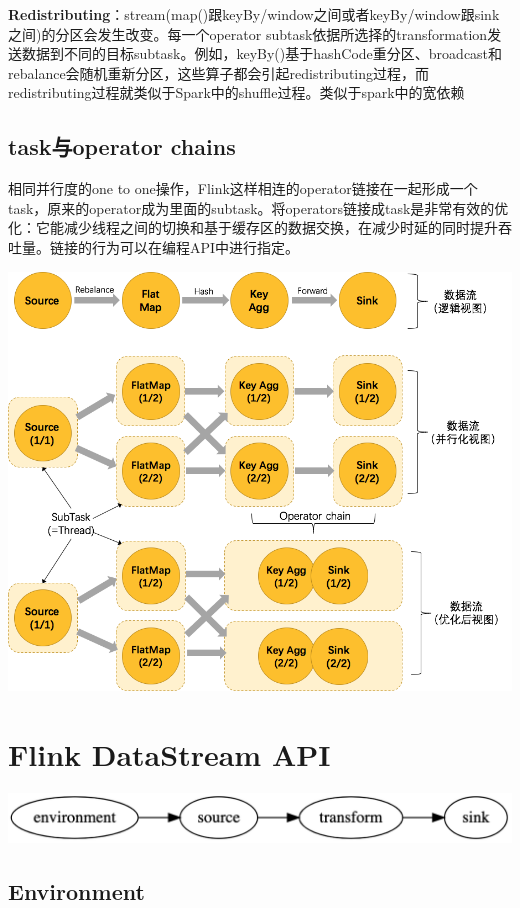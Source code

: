 \documentclass[oneside]{ctexbook}
\begin{document}
\textbf{Redistributing}：stream(map()跟keyBy/window之间或者keyBy/window跟sink之间)的分区会发生改变。每一个operator subtask依据所选择的transformation发送数据到不同的目标subtask。例如，keyBy()基于hashCode重分区、broadcast和rebalance会随机重新分区，这些算子都会引起redistributing过程，而redistributing过程就类似于Spark中的shuffle过程。类似于spark中的宽依赖

\section{task与operator chains}

相同并行度的one to one操作，Flink这样相连的operator链接在一起形成一个task，原来的operator成为里面的subtask。将operators链接成task是非常有效的优化：它能减少线程之间的切换和基于缓存区的数据交换，在减少时延的同时提升吞吐量。链接的行为可以在编程API中进行指定。

\noindent \includegraphics[width=\textwidth]{operatorschains.png}

\chapter{Flink DataStream API}

\noindent \includegraphics[width=\textwidth]{dot-example.png}

\section{Environment}
\end{document}
